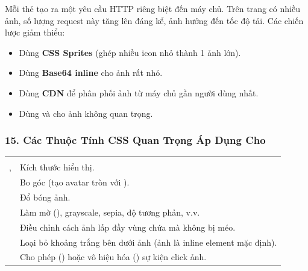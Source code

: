 \begin{noteBox}
Mỗi thẻ  tạo ra một yêu cầu HTTP riêng biệt đến máy chủ. Trên trang có nhiều ảnh, số lượng request này tăng lên đáng kể, ảnh hưởng đến tốc độ tải. Các chiến lược giảm thiểu:
\begin{itemize}[leftmargin=1.5em, itemsep=2pt, parsep=0pt]
    \item Dùng \textbf{CSS Sprites} (ghép nhiều icon nhỏ thành 1 ảnh lớn).
    \item Dùng \textbf{Base64 inline} cho ảnh rất nhỏ.
    \item Dùng \textbf{CDN} để phân phối ảnh từ máy chủ gần người dùng nhất.
    \item Dùng  và  cho ảnh không quan trọng.
\end{itemize}
\end{noteBox}

\subsubsection{15. Các Thuộc Tính CSS Quan Trọng Áp Dụng Cho }

\begin{prettyTableBox}
\begin{tabularx}{\linewidth}{C{3.5cm} Z}
 &  \\
,  & Kích thước hiển thị. \\
 & Bo góc (tạo avatar tròn với ). \\
 & Đổ bóng ảnh. \\
 & Làm mờ (), grayscale, sepia, độ tương phản, v.v. \\
 & Điều chỉnh cách ảnh lấp đầy vùng chứa mà không bị méo. \\
 & Loại bỏ khoảng trắng bên dưới ảnh (ảnh là inline element mặc định). \\
 & Cho phép () hoặc vô hiệu hóa () sự kiện click ảnh. \\
\end{tabularx}
\end{prettyTableBox}

